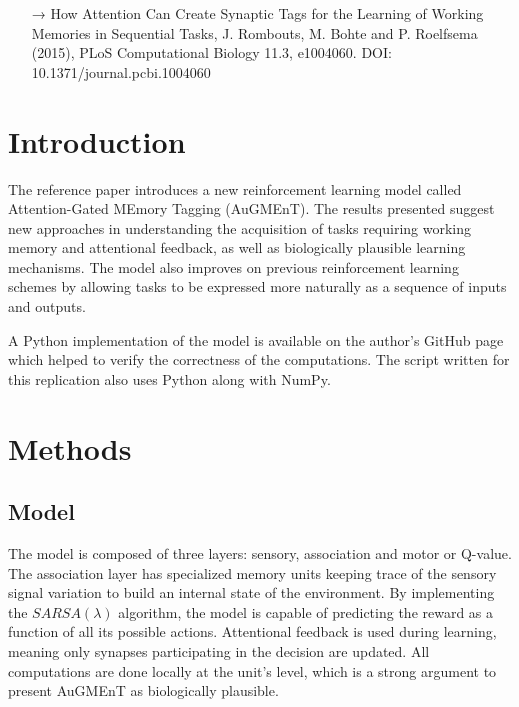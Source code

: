 \documentclass[10pt,a4paper,onecolumn]{article}
\begin{document}
\begin{rebox}
\small
\begin{flushleft}
\begin{itemize}
    \item[→] How Attention Can Create Synaptic Tags for the Learning of Working
Memories in Sequential Tasks, J. Rombouts, M. Bohte and P. Roelfsema
(2015), PLoS Computational Biology 11.3, e1004060. DOI:
10.1371/journal.pcbi.1004060
  \end{itemize}\par
\end{flushleft}
\end{rebox}


\section{Introduction}\label{introduction}

The reference paper \autocite{rombouts:2015} introduces a new
reinforcement learning model called Attention-Gated MEmory Tagging
(AuGMEnT). The results presented suggest new approaches in understanding
the acquisition of tasks requiring working memory and attentional
feedback, as well as biologically plausible learning mechanisms. The
model also improves on previous reinforcement learning schemes by
allowing tasks to be expressed more naturally as a sequence of inputs
and outputs.

A Python implementation of the model is available on the author's GitHub
page \autocite{rombouts:github} which helped to verify the correctness
of the computations. The script written for this replication also uses
Python along with NumPy.

\section{Methods}\label{methods}

\subsection{Model}\label{model}

The model is composed of three layers: sensory, association and motor or
Q-value. The association layer has specialized memory units keeping
trace of the sensory signal variation to build an internal state of the
environment. By implementing the \(SARSA(\lambda)\) algorithm, the model
is capable of predicting the reward as a function of all its possible
actions. Attentional feedback is used during learning, meaning only
synapses participating in the decision are updated. All computations are
done locally at the unit's level, which is a strong argument to present
AuGMEnT as biologically plausible.
\end{document}
